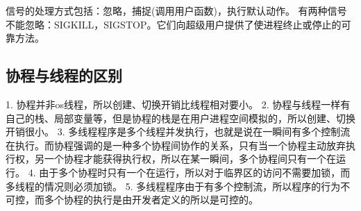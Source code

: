 信号的处理方式包括：忽略，捕捉(调用用户函数)，执行默认动作。
有两种信号不能忽略：SIGKILL，SIGSTOP。它们向超级用户提供了使进程终止或停止的可靠方法。

\subsection{协程与线程的区别}
1. 协程并非os线程，所以创建、切换开销比线程相对要小。
        2. 协程与线程一样有自己的栈、局部变量等，但是协程的栈是在用户进程空间模拟的，所以创建、切换开销很小。
        3. 多线程程序是多个线程并发执行，也就是说在一瞬间有多个控制流在执行。而协程强调的是一种多个协程间协作的关系，只有当一个协程主动放弃执行权，另一个协程才能获得执行权，所以在某一瞬间，多个协程间只有一个在运行。
        4. 由于多个协程时只有一个在运行，所以对于临界区的访问不需要加锁，而多线程的情况则必须加锁。
        5. 多线程程序由于有多个控制流，所以程序的行为不可控，而多个协程的执行是由开发者定义的所以是可控的。


\clearpage
















